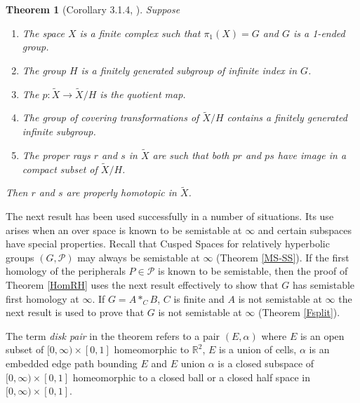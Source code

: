 \documentclass[12pt]{article}
\newtheorem{theorem}{Theorem}[subsection]
\begin{document}
\begin{theorem} [Corollary 3.1.4, \cite{M1}]
Suppose 
\begin{enumerate}
\item The space $X$ is a finite complex such that $\pi_1(X)=G$ and $G$ is a 1-ended group. 

\item The group $H$ is a finitely generated subgroup of infinite index in $G$.

\item The $p: \tilde X\to \tilde X/H$ is the  quotient map. 

\item The group of covering transformations of $\tilde X/H$ contains a finitely generated infinite subgroup.  

\item The proper rays $r$ and $s$ in $\tilde X$ are such that both $pr$ and $ps$ have image in a compact subset of $\tilde X/H$.
\end{enumerate}
Then $r$ and $s$ are properly homotopic in $\tilde X$. 
\end{theorem}


The next result has been used successfully in a number of situations. Its use arises when an over space is known to be  semistable at $\infty$ and certain subspaces have special properties. Recall that Cusped Spaces for relatively hyperbolic groups $(G,\mathcal P)$ may always be semistable at $\infty$ (Theorem \ref{MS-SS}).  If the first homology of the peripherals $P\in \mathcal P$ is known to be semistable, then the proof of Theorem \ref{HomRH} uses the next result effectively to show that $G$ has semistable first homology at $\infty$. If $G=A\ast_CB$, $C$ is finite and $A$ is  not semistable at $\infty$ the next result is used to prove that $G$ is not semistable at $\infty$ (Theorem \ref{Fsplit}).

The term {\it disk pair} in the theorem refers to a pair  $(E,\alpha)$ where $E$ is an open subset of $[0,\infty)\times [0,1]$ homeomorphic to $\mathbb R^2$, $E$ is a union of cells, $\alpha$ is an embedded edge path bounding $E$ and $E$ union $\alpha$ is a closed subspace of $[0,\infty)\times [0,1]$ homeomorphic to a closed ball or a closed half space in $[0,\infty)\times [0,1]$.
\end{document}
